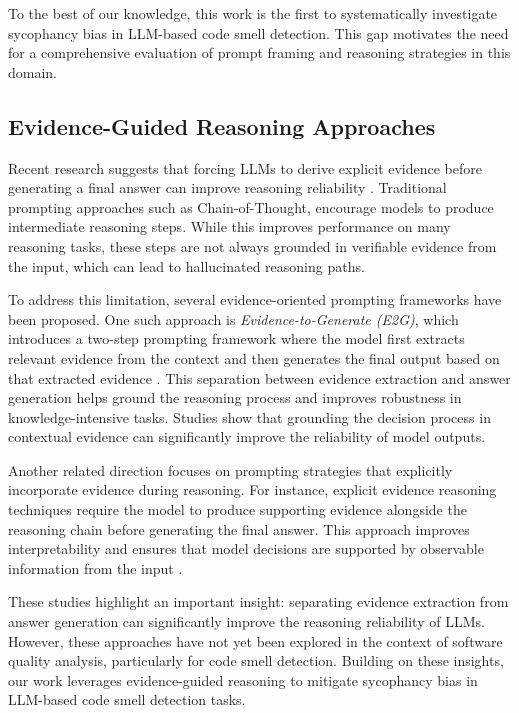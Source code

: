 \documentclass[sigconf,review,anonymous]{acmart}
\begin{document}
To the best of our knowledge, this work is the first to systematically investigate sycophancy bias in LLM-based code smell detection. This gap motivates the need for a comprehensive evaluation of prompt framing and reasoning strategies in this domain.

\subsection{Evidence-Guided Reasoning Approaches}

Recent research suggests that forcing LLMs to derive explicit evidence before generating a final answer can improve reasoning reliability \cite{ni2025efficient,li2025cot}. Traditional prompting approaches such as Chain-of-Thought, encourage models to produce intermediate reasoning steps. While this improves performance on many reasoning tasks, these steps are not always grounded in verifiable evidence from the input, which can lead to hallucinated reasoning paths.

To address this limitation, several evidence-oriented prompting frameworks have been proposed. One such approach is \textit{Evidence-to-Generate (E2G)}, which introduces a two-step prompting framework where the model first extracts relevant evidence from the context and then generates the final output based on that extracted evidence \cite{parvez2025chain}. This separation between evidence extraction and answer generation helps ground the reasoning process and improves robustness in knowledge-intensive tasks.  Studies show that grounding the decision process in contextual evidence can significantly improve the reliability of model outputs.

Another related direction focuses on prompting strategies that explicitly incorporate evidence during reasoning. For instance, explicit evidence reasoning techniques require the model to produce supporting evidence alongside the reasoning chain before generating the final answer. This approach improves interpretability and ensures that model decisions are supported by observable information from the input \cite{ma2023chain}.

These studies highlight an important insight: separating evidence extraction from answer generation can significantly improve the reasoning reliability of LLMs. However, these approaches have not yet been explored in the context of software quality analysis, particularly for code smell detection. Building on these insights, our work leverages evidence-guided reasoning to mitigate sycophancy bias in LLM-based code smell detection tasks.
\end{document}
